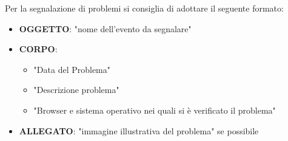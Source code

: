 \documentclass[5pt]{article}
\begin{document}
        Per la segnalazione di problemi si consiglia di adottare il seguente formato:
\begin{itemize}
    \item \textbf{OGGETTO}: "nome dell'evento da segnalare"
    \item \textbf{CORPO}:
    \begin{itemize}
        \item "Data del Problema"
        \item "Descrizione problema"
        \item "Browser e sistema operativo nei quali si è verificato il problema"
    \end{itemize}
    \item \textbf{ALLEGATO}: "immagine illustrativa del problema" se possibile
\end{itemize}
        
        
        
			
\end{document}
